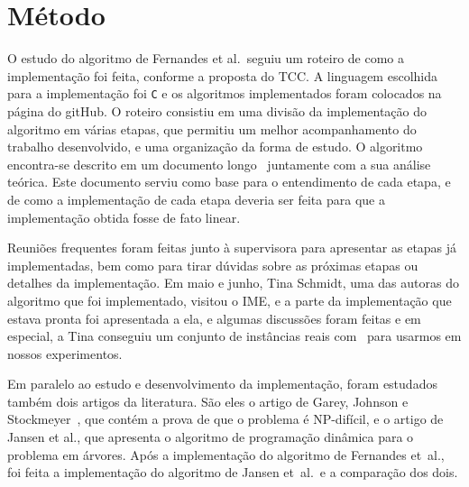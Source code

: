 \documentclass[a4paper,12pt]{article}
\begin{document}
\newpage



\section{Método}

O estudo do algoritmo de Fernandes et al.\ seguiu um roteiro de
como a implementação foi feita, conforme a proposta do TCC. 
A linguagem escolhida para a implementação foi \texttt{C} e os 
algoritmos implementados foram colocados na página do gitHub. 
O roteiro consistiu em uma divisão da implementação do algoritmo 
em várias etapas, que permitiu um melhor acompanhamento do 
trabalho desenvolvido, e uma organização da forma de estudo. 
O algoritmo encontra-se descrito em um documento 
longo~\cite{Schmidt15} juntamente com a sua análise teórica. 
Este documento serviu como base para o entendimento de cada 
etapa, e de como a implementação de cada etapa deveria ser feita 
para que a implementação obtida fosse de fato linear. 

Reuniões frequentes foram feitas junto à supervisora para 
apresentar as etapas já implementadas, bem como para tirar dúvidas 
sobre as próximas etapas ou detalhes da implementação. 
Em maio e junho, Tina Schmidt, uma das autoras do algoritmo que 
foi implementado, visitou o IME, e a parte da 
implementação que estava pronta foi apresentada a ela, e 
algumas discussões foram feitas e em especial, a Tina conseguiu
um conjunto de instâncias reais com~\cite{Kampmeier} para usarmos 
em nossos experimentos.   

Em paralelo ao estudo e desenvolvimento da implementação, foram 
estudados também dois artigos da literatura. São eles o artigo 
de Garey, 
Johnson e Stockmeyer~\cite{GareyJS76}, que contém a prova de que o 
problema é NP-difícil, e o artigo de Jansen et al., que apresenta 
o algoritmo de programação dinâmica para o problema em árvores. 
Após a implementação do algoritmo de Fernandes et~al., foi feita 
a implementação do algoritmo de Jansen et~al.\ e a comparação dos 
dois. 

\newpage

\end{document}
